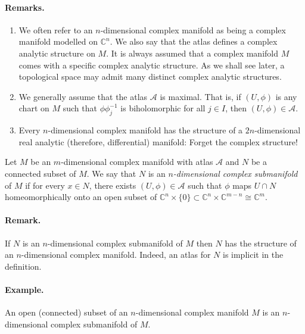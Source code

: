 \paragraph*{Remarks.}
\begin{enumerate}
\item We often refer to an $n$-dimensional complex manifold as being a complex manifold modelled on $\mathbb C^n$. We also say that the atlas defines a complex analytic structure on $M$. It is always assumed that a complex manifold $M$ comes with a specific complex analytic structure. As we shall see later, a topological space may admit many distinct complex analytic structures.
\item We generally assume that the atlas $\mathcal A$ is maximal. That is, if $(U,\phi)$ is any chart on $M$ such that $\phi\phi_j^{-1}$ is biholomorphic for all $j\in I$, then $(U,\phi)\in\mathcal A$.
\item Every $n$-dimensional complex manifold has the structure of a $2n$-dimensional real analytic (therefore, differential) manifold: Forget the complex structure!
\end{enumerate}

 Let $M$ be an $m$-dimensional complex manifold with atlas $\mathcal A$ and $N$ be a connected subset of $M$. We say that $N$ is an \emph{$n$-dimensional complex submanifold} of $M$ if for every $x\in N$, there exists $(U,\phi)\in\mathcal A$ such that $\phi$ maps $U\cap N$ homeomorphically onto an open subset of $\mathbb C^n\times\{0\}\subset\mathbb C^n\times\mathbb C^{m-n}\cong\mathbb C^m$.

\paragraph*{Remark.} If $N$ is an $n$-dimensional complex submanifold of $M$ then $N$ has the structure of an $n$-dimensional complex manifold. Indeed, an atlas for $N$ is implicit in the definition.

\paragraph*{Example.} An open (connected) subset of an $n$-dimensional complex manifold $M$ is an $n$-dimensional complex submanifold of $M$.

